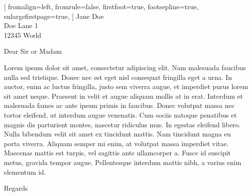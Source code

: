 \documentclass[
	a4paper,
	version=last,
	11pt,
]{scrlttr2}
\begin{document}
\setlength{\parindent}{0pt}





\begin{letter}[
	fromalign=left, %
	fromrule=false, %
	firstfoot=true,
	footsepline=true,
	enlargefirstpage=true,
]{
	Jane Doe\\
	Doe Lane 1\\
	12345 World
}


\opening{Dear Sir or Madam}

Lorem ipsum dolor sit amet, consectetur adipiscing elit. Nam malesuada faucibus nulla sed tristique. Donec nec est eget nisl consequat fringilla eget a urna. In auctor, enim ac luctus fringilla, justo sem viverra augue, et imperdiet purus lorem sit amet neque. Praesent in velit et augue aliquam mollis at in erat. Interdum et malesuada fames ac ante ipsum primis in faucibus. Donec volutpat massa nec tortor eleifend, ut interdum augue venenatis. Cum sociis natoque penatibus et magnis dis parturient montes, nascetur ridiculus mus. In egestas eleifend libero. Nulla bibendum velit sit amet ex tincidunt mattis. Nam tincidunt magna eu porta viverra. Aliquam semper mi enim, at volutpat massa imperdiet vitae. Maecenas mattis est turpis, vel sagittis ante ullamcorper a. Fusce id suscipit metus, gravida tempor augue. Pellentesque interdum mattis nibh, a varius enim elementum id. 

\vfill

\closing{Regards}
	

\end{letter}
\end{document}
